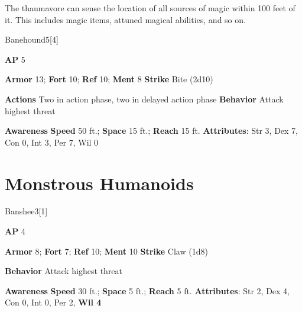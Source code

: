 \vspace{0.5em}
The thaumavore can sense the location of all sources of magic within 100 feet of it.
This includes magic items, attuned magical abilities, and so on.





\begin{monsection}{Banehound}{5}[4]
\vspace{-1em}\vspace{-1em}
\begin{spellcontent}
\begin{spelltargetinginfo}
{\textbf{AP} 5}

\pari \textbf{Armor} 13;
\textbf{Fort} 10;
\textbf{Ref} 10;
\textbf{Ment} 8
\pari \textbf{Strike} Bite  (2d10)


\pari \textbf{Actions} Two in action phase, two in delayed action phase
\pari \textbf{Behavior} Attack highest threat
\end{spelltargetinginfo}
\end{spellcontent}

\begin{monsterfooter}
\pari \textbf{Awareness} 
\pari \textbf{Speed} 50 ft.;
\textbf{Space} 15 ft.;
\textbf{Reach} 15 ft.
\pari \textbf{Attributes}:
Str 3,
Dex 7,
Con 0,
Int 3,
Per 7,
Wil 0
\end{monsterfooter}
\end{monsection}




\section{Monstrous Humanoids}

\begin{monsection}{Banshee}{3}[1]
\vspace{-1em}\vspace{-1em}
\begin{spellcontent}
\begin{spelltargetinginfo}
{\textbf{AP} 4}

\pari \textbf{Armor} 8;
\textbf{Fort} 7;
\textbf{Ref} 10;
\textbf{Ment} 10
\pari \textbf{Strike} Claw  (1d8)



\pari \textbf{Behavior} Attack highest threat
\end{spelltargetinginfo}
\end{spellcontent}

\begin{monsterfooter}
\pari \textbf{Awareness} 
\pari \textbf{Speed} 30 ft.;
\textbf{Space} 5 ft.;
\textbf{Reach} 5 ft.
\pari \textbf{Attributes}:
Str 2,
Dex 4,
Con 0,
Int 0,
Per 2,
\textbf{Wil 4}
\end{monsterfooter}
\end{monsection}



